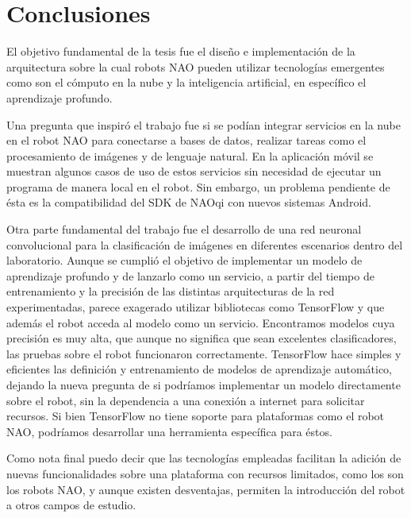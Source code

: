 \chapter*{Conclusiones}
\label{\detokenize{conclusion:cloudnao-una-arquitectura-de-software-para-la-integracion-de-computo-en-la-nube-con-robots-nao}}\label{\detokenize{conclusion:conclusion}}\label{\detokenize{conclusion::doc}}


El objetivo fundamental de la tesis fue el diseño e implementación de
la arquitectura sobre la cual robots NAO pueden
utilizar tecnologías emergentes como son el cómputo en la nube y
la inteligencia artificial, en específico el aprendizaje profundo.

Una pregunta que inspiró el trabajo
fue si se podían integrar servicios en la nube
en el robot NAO para conectarse a bases de datos, realizar tareas como el procesamiento de imágenes y de lenguaje natural. En la aplicación
móvil se muestran algunos casos de uso de estos servicios
sin necesidad de ejecutar un programa de manera local
en el robot. Sin embargo, un problema pendiente de ésta
es la compatibilidad del SDK de NAOqi con nuevos sistemas
Android.

Otra parte fundamental del trabajo fue el desarrollo
de una red neuronal convolucional para la clasificación
de imágenes en diferentes escenarios dentro del laboratorio.
Aunque se cumplió el objetivo de implementar un modelo
de aprendizaje profundo y de lanzarlo como un servicio, 
a partir del tiempo de entrenamiento y la precisión de las
distintas arquitecturas de la red experimentadas,
parece exagerado utilizar bibliotecas como TensorFlow 
y que además el robot acceda al modelo como
un servicio.
Encontramos modelos
cuya precisión es muy alta, que aunque no significa que sean excelentes clasificadores,
las pruebas sobre el robot funcionaron correctamente.
TensorFlow hace simples y eficientes
las definición y entrenamiento de modelos de aprendizaje automático,
dejando la nueva pregunta de si podríamos implementar un modelo 
directamente sobre el robot, sin la dependencia a una conexión
a internet para solicitar recursos. Si bien TensorFlow
no tiene soporte para plataformas como el robot NAO, podríamos
desarrollar una herramienta específica para éstos. 

Como nota final puedo decir que las tecnologías empleadas
facilitan la adición
de nuevas funcionalidades sobre una plataforma con recursos
limitados, como los son los robots NAO, y aunque existen desventajas,
permiten la introducción
del robot a otros campos de estudio.